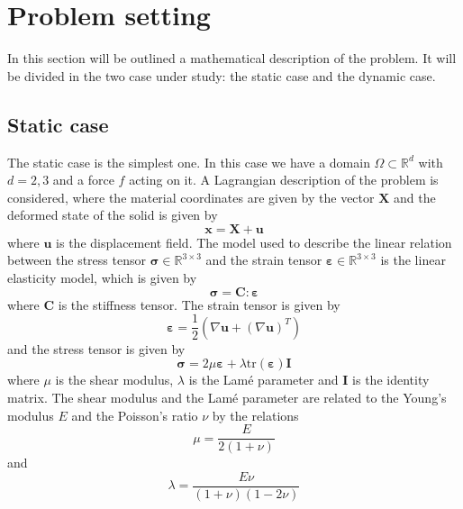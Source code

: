 \section{Problem setting}
\label{sec:problem_setting}
In this section will be outlined a mathematical description of the problem. It will be divided in the two case under study: the static case and the dynamic case.

\subsection{Static case}
The static case is the simplest one. In this case we have a domain $\Omega \subset \mathbb{R}^d$ with $d=2,3$ and a force $f$ acting on it. A Lagrangian description of the problem is considered, where the material coordinates are given by the vector $\bm{X}$ and the deformed state of the solid is given by
\begin{equation}
    \bm{x} = \bm{X} + \bm{u}
\label{eq:deformation}
\end{equation}
where $\bm{u}$ is the displacement field. The model used to describe the linear relation between the stress tensor $\bm{\sigma} \in \mathbb{R}^{3\times 3}$ and the strain tensor $\bm{\varepsilon} \in \mathbb{R}^{3\times 3}$ is the linear elasticity model, which is given by
\begin{equation}
    \bm{\sigma} = \bm{C} : \bm{\varepsilon}
\label{eq:linear_elasticity}
\end{equation}
where $\bm{C}$ is the stiffness tensor. The strain tensor is given by 
\begin{equation}
    \bm{\varepsilon} = \frac{1}{2} \left( \nabla \bm{u} + (\nabla \bm{u})^T \right)
\label{eq:strain_tensor}
\end{equation}
and the stress tensor is given by
\begin{equation}
    \bm{\sigma} =  2 \mu \bm{\varepsilon} + \lambda \text{tr}(\bm{\varepsilon}) \bm{I}
\label{eq:stress_tensor}
\end{equation}
where $\mu$ is the shear modulus, $\lambda$ is the Lamé parameter and $\bm{I}$ is the identity matrix. The shear modulus and the Lamé parameter are related to the Young's modulus $E$ and the Poisson's ratio $\nu$ by the relations
\begin{equation}
    \mu = \frac{E}{2(1+\nu)}
\end{equation}
and
\begin{equation}
    \lambda = \frac{E\nu}{(1+\nu)(1-2\nu)}
\end{equation}
